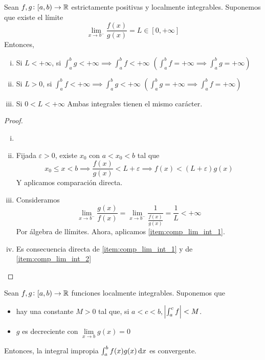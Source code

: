 \begin{prop}
	Sean $f,g \colon [a,b) \to \mathbb{R}$ estrictamente positivas y localmente
	integrables. Suponemos que existe el límite
	\[
		\lim_{x \to b^-} \frac{f(x)}{g(x)} = L \in [0,+\infty]
	\]
	Entonces, \begin{enumerate}[i)]
		\item\label{item:comp_lim_int_1}
			Si $L < +\infty$, si $\int^b_a g < +\infty \implies \int^b_af <
			+\infty$ $\left( \int^b_a f = +\infty \implies \int^b_a g =
			+\infty\right)$
		\item\label{item:comp_lim_int_2}
			Si $L > 0$, si $\int^b_a f < +\infty \implies \int^b_a g <
			+\infty$ $\left(\int^b_a g = +\infty \implies \int^b_a f =
			+\infty\right)$
		\item Si $0 < L < +\infty$ Ambas integrales tienen el mismo carácter.
	\end{enumerate}
\end{prop}

\begin{proof}
	\begin{enumerate}[i)]
		\item[]
		\item Fijada $\varepsilon > 0$, existe $x_0$ con $a < x_0 < b$ tal que
			\[
				x_0 \leq x < b \implies \frac{f(x)}{g(x)} < L +
				\varepsilon \implies f(x) < (L+\varepsilon)g(x)
			\]
			Y aplicamos comparación directa.
		\item Consideramos
			\[
				\lim_{x \to b^-} \frac{g(x)}{f(x)} = \lim_{x \to b^-}
				\frac{1}{\frac{f(x)}{g(x)}} = \frac{1}{L} < +\infty
			\]
			Por álgebra de llímites. Ahora, aplicamos
			\ref{item:comp_lim_int_1}.
		\item Es consecuencia directa de \ref{item:comp_lim_int_1} y de
			\ref{item:comp_lim_int_2}
	\end{enumerate}
\end{proof}

\begin{prop}
	Sean $f,g \colon [a,b) \to \mathbb{R}$ funciones localmente integrables. Suponemos
	que
	\begin{itemize}
		\item hay una constante $M > 0$ tal que, si $a < c < b$,
			$\abs{\int^c_a f} < M$.
		\item $g$ es decreciente con $\lim\limits_{x \to b} g(x) = 0$
	\end{itemize}
	Entonces, la integral impropia $\int^b_a f(x)g(x)\dif x$ es convergente.
\end{prop}

